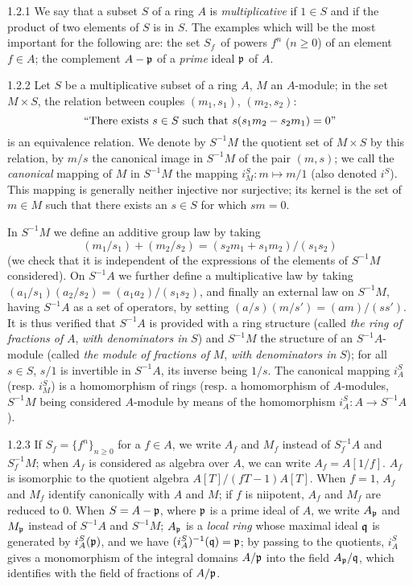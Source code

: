 \documentclass[../main.tex]{subfiles}
\begin{document}
\begin{cx}{1.2.1}
We say that a subset $S$ of a ring $A$ is \emph{multiplicative} if $1\in S$ and if the product of two elements of
$S$ is in $S$. The examples which will be the most important for the following are:
 the set $S_f$ of powers $f^n$ ($n\geq 0$) of an element $f\in A$;
 the complement $A-\mathfrak{p}$ of a \emph{prime} ideal $\mathfrak{p}$ of $A$.
\end{cx}

\begin{cx}{1.2.2}
Let $S$ be a multiplicative subset of a ring $A$, $M$ an $A$-module; in the set $M\times S$, the relation between
couples $(m_1,s_1)$, $(m_2,s_2)$:
\[
   ``\text{There exists } s\in S\text{ such that } s(s_1 m_2-s_2 m_1)=0"
\]
is an equivalence relation. We denote by $S^{-1}M$ the quotient set of $M\times S$ by this relation, by $m/s$ the canonical
image in $S^{-1}M$ of the pair $(m,s)$; we call the \emph{canonical} mapping of $M$ in $S^{-1}M$ the mapping $i_M^S:m\mapsto m/1$
(also denoted $i^S$). This mapping is generally neither injective nor surjective; its kernel is the set of $m\in M$ such that there
exists an $s\in S$ for which $sm=0$.

In $S^{-1}M$ we define an additive group law by taking
\[
  (m_1/s_1)+(m_2/s_2)=(s_2 m_1+s_1 m_2)/(s_1 s_2)
\]
(we check that it is independent of the expressions of the elements of $S^{-1}M$ considered). On $S^{-1}A$ we further define
a multiplicative law by taking $(a_1/s_1)(a_2/s_2)=(a_1 a_2)/(s_1 s_2)$, and finally an external law on $S^{-1}M$, having
$S^{-1}A$ as a set of operators, by setting $(a/s)(m/s')=(am)/(ss')$. It is thus verified that $S^{-1}A$ is provided with a
ring structure (called \emph{the ring of fractions of} $A$, \emph{with denominators in} $S$) and $S^{-1}M$ the structure of
an $S^{-1}A$-module (called \emph{the  module of fractions of} $M$, \emph{with denominators in} $S$); for all $s\in S$,
$s/1$ is invertible in $S^{-1}A$, its inverse being $1/s$. The canonical mapping $i_A^S$ (resp. $i_M^S$) is a homomorphism
of rings (resp. a homomorphism of $A$-modules, $S^{-1}M$ being considered $A$-module by means of the homomorphism
$i_A^S:A\to S^{-1}A$).
\end{cx}

\begin{cx}{1.2.3}
If $S_f=\{f^n\}_{n\geq 0}$ for a $f\in A$, we write $A_f$ and $M_f$ instead of $S_f^{-1}A$ and $S_f^{-1}M$; when $A_f$ is
considered as algebra over $A$, we can write $A_f=A[1/f]$. $A_f$ is isomorphic to the quotient algebra $A[T]/(fT-1)A[T]$.
When $f=1$, $A_f$ and $M_f$ identify canonically with $A$ and $M$; if $f$ is niipotent, $A_f$ and $M_f$ are reduced to $0$.
When $S=A-\mathfrak{p}$, where $\mathfrak{p}$ is a prime ideal of $A$, we write $A_\mathfrak{p}$ and $M_\mathfrak{p}$ instead of $S^{-1}A$ and $S^{-1}M$;
$A_\mathfrak{p}$ is a \emph{local ring} whose maximal ideal $\mathfrak{q}$ is generated by $i_A^S(\mathfrak{p})$, and we have
$(i_A^S)^{-1}(\mathfrak{q})=\mathfrak{p}$; by passing to the quotients, $i_A^S$ gives a monomorphism of the integral domains $A/\mathfrak{p}$ into the
field $A_\mathfrak{p}/\mathfrak{q}$, which identifies with the field of fractions of $A/\mathfrak{p}$.
\end{cx}
\end{document}
